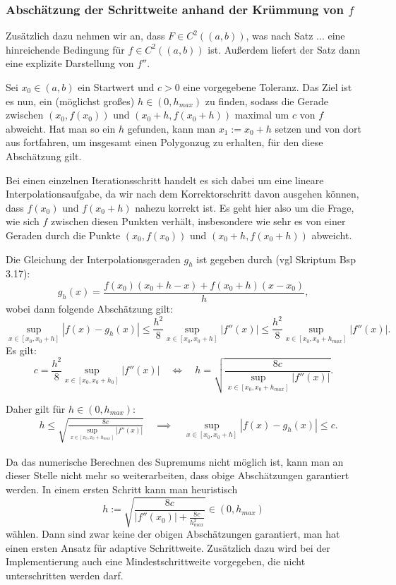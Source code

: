 \documentclass[a4paper,11pt,bibliography=totoc,listof=totoc,headinclude=true,cleardoublepage=empty,oneside]{scrartcl}
\newcounter{satz}
\begin{document}
\subsubsection{Abschätzung der Schrittweite anhand der Krümmung von $f$}\label{chap:5.1.1}

 Zusätzlich dazu nehmen wir an, dass $F \in C^2((a,b))$, was nach Satz ... eine hinreichende Bedingung für $f \in C^2((a,b))$ ist. Außerdem liefert der Satz dann eine explizite Darstellung von $f''$.  

Sei $x_0 \in (a,b)$ ein Startwert und $c>0$ eine vorgegebene Toleranz. Das Ziel ist es nun, ein (möglichst großes) $h \in (0,h_{max})$ zu finden, sodass die Gerade zwischen $(x_0,f(x_0))$ und $(x_0+h,f(x_0+h))$ maximal um $c$ von $f$ abweicht. Hat man so ein $h$ gefunden, kann man $x_1 := x_0+h$ setzen und von dort aus fortfahren, um insgesamt einen Polygonzug zu erhalten, für den diese Abschätzung gilt. 

Bei einen einzelnen Iterationsschritt handelt es sich dabei um eine lineare Interpolationsaufgabe, da wir nach dem Korrektorschritt davon ausgehen können, dass $f(x_0)$ und $f(x_0+h)$ nahezu korrekt ist. Es geht hier also um die Frage, wie sich $f$ zwischen diesen Punkten verhält, insbesondere wie sehr es von einer Geraden durch die Punkte $(x_0,f(x_0))$ und $(x_0+h,f(x_0+h))$ abweicht.

 Die Gleichung der Interpolationsgeraden $g_h$ ist gegeben durch (vgl Skriptum Bsp 3.17):
\[
g_h (x) = \frac{f(x_0)(x_0+h-x) + f(x_0+h)(x-x_0)}{h},
\]
wobei dann folgende Abschätzung gilt:
\[
\sup_{x \in [x_0,x_0+h]} |f(x)-g_h(x)|  \le \frac{h^2}{8} \sup_{x \in [x_0,x_0+h]} |f''(x)| \le \frac{h^2}{8} \sup_{x \in [x_0,x_0+h_{max}]} |f''(x)|.
\]
Es gilt:
\[
c = \frac{h^2}{8} \sup_{x \in [x_0,x_0+h_0]} |f''(x)| \quad \iff \quad h = \sqrt{ \frac{8c}{\sup_{x \in [x_0,x_0+h_{max}]} |f''(x)|}}.
\]

Daher gilt für $h \in (0,h_{max})$:
\begin{align}\label{eq:absch_h}
\quad h \le \sqrt{ \frac{8c}{\sup_{x \in [x_0,x_0+h_{max}]} |f''(x)|}} \quad \implies \quad \sup_{x \in [x_0,x_0+h]} |f(x)-g_h(x)| \le c.
\end{align}

Da das numerische Berechnen des Supremums nicht möglich ist, kann man an dieser Stelle nicht mehr so weiterarbeiten, dass obige Abschätzungen garantiert werden. In einem ersten Schritt kann man heuristisch
\[
h := \sqrt{\frac{8c}{|f''(x_0)| +\frac{8c}{h_{max}^2} }} \in (0,h_{max})
\]
wählen. Dann sind zwar keine der obigen Abschätzungen garantiert, man hat einen ersten Ansatz für adaptive Schrittweite. Zusätzlich dazu wird bei der Implementierung auch eine Mindestschrittweite vorgegeben, die nicht unterschritten werden darf. 
\end{document}
